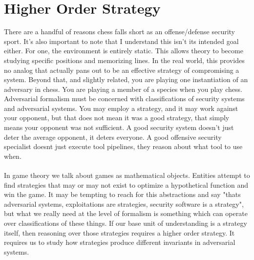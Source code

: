 \documentclass{article}
\begin{document}
	\section{Higher Order Strategy}
	There are a handful of reasons chess falls short as an offense/defense security sport. It's also important to note that I understand this isn't its intended goal either. For one, the environment is entirely static. This allows theory to become studying specific positions and memorizing lines. In the real world, this provides no analog that actually pans out to be an effective strategy of compromising a system. Beyond that, and slightly related, you are playing one instantiation of an adversary in chess. You are playing a member of a species when you play chess. Adversarial formalism must be concerned with classifications of security systems and adversarial systems. You may employ a strategy, and it may work against your opponent, but that does not mean it was a good strategy, that simply means your opponent was not sufficient. A good security system doesn't just deter the average opponent, it deters everyone. A good offensive security specialist doesnt just execute tool pipelines, they reason about what tool to use when.\\\\
	In game theory we talk about games as mathematical objects. Entities attempt to find strategies that may or may not exist to optimize a hypothetical function and win the game. It may be tempting to reach for this abstractions and say "thats adversarial systems, exploitations are strategies, security software is a strategy", but what we really need at the level of formalism is something which can operate over classifications of these things. If our base unit of understanding is a strategy itself, then reasoning over those strategies requires a higher order strategy. It requires us to study how strategies produce different invariants in adversarial systems. 
\end{document}
